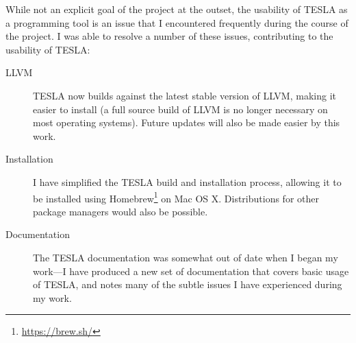 While not an explicit goal of the project at the outset, the usability of TESLA
as a programming tool is an issue that I encountered frequently during the
course of the project. I was able to resolve a number of these issues,
contributing to the usability of TESLA:
\begin{description}
  \item[LLVM] TESLA now builds against the latest stable version of LLVM, making
    it easier to install (a full source build of LLVM is no longer necessary on
    most operating systems). Future updates will also be made easier by this work.

  \item[Installation] I have simplified the TESLA build and installation
    process, allowing it to be installed using
    Homebrew\footnote{\url{https://brew.sh/}} on Mac OS X. Distributions for
    other package managers would also be possible.

  \item[Documentation] The TESLA documentation was somewhat out of date when I
    began my work---I have produced a new set of documentation that covers basic
    usage of TESLA, and notes many of the subtle issues I have experienced
    during my work.
\end{description}
